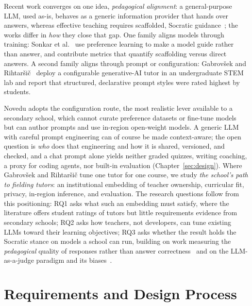 \documentclass[runningheads]{llncs}
\begin{document}
Recent work converges on one idea, \emph{pedagogical alignment}: a general-purpose LLM, used as-is, behaves as a generic information provider that hands over answers, whereas effective teaching requires scaffolded, Socratic guidance~\cite{sonkar2024pedagogical}; the works differ in \emph{how} they close that gap. One family aligns models through training: Sonkar et al.~\cite{sonkar2024pedagogical} use preference learning to make a model guide rather than answer, and contribute metrics that quantify scaffolding versus direct answers. A second family aligns through prompt or configuration: Gabrov\v{s}ek and Rihtar\v{s}i\v{c}~\cite{gabrovsek2025custom} deploy a configurable generative-AI tutor in an undergraduate STEM lab and report that structured, declarative prompt styles were rated highest by students.

Novedu adopts the configuration route, the most realistic lever available to a secondary school, which cannot curate preference datasets or fine-tune models but can author prompts and use in-region open-weight models. A generic LLM with careful prompt engineering can of course be made context-aware; the open question is \emph{who} does that engineering and how it is shared, versioned, and checked, and a chat prompt alone yields neither graded quizzes, writing coaching, a proxy for coding agents, nor built-in evaluation (Chapter~\ref{sec:design}). Where Gabrov\v{s}ek and Rihtar\v{s}i\v{c} tune one tutor for one course, we study \emph{the school's path to fielding tutors}: an institutional embedding of teacher ownership, curricular fit, privacy, in-region inference, and evaluation. The research questions follow from this positioning: RQ1 asks what such an embedding must satisfy, where the literature offers student ratings of tutors but little requirements evidence from secondary schools; RQ2 asks how teachers, not developers, can tune existing LLMs toward their learning objectives; RQ3 asks whether the result holds the Socratic stance on models a school can run, building on work measuring the \emph{pedagogical} quality of responses rather than answer correctness~\cite{tack2022aiteacher} and on the LLM-as-a-judge paradigm and its biases~\cite{zheng2023judging}.

\section{Requirements and Design Process}
\label{sec:requirements}
\end{document}
